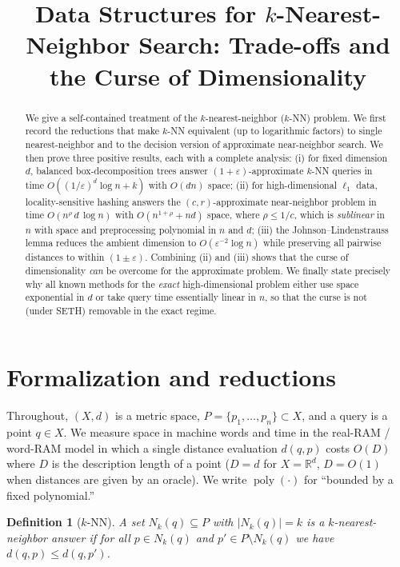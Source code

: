 \documentclass{amsart}
\newtheorem{definition}{Definition}
\DeclareMathOperator{\poly}{poly}
\newcommand{\R}{\mathbb{R}}
\newcommand{\eps}{\varepsilon}
\begin{document}
\title{Data Structures for $k$-Nearest-Neighbor Search: Trade-offs and the Curse of Dimensionality}
\maketitle

\begin{abstract}
We give a self-contained treatment of the $k$-nearest-neighbor ($k$-NN) problem.
We first record the reductions that make $k$-NN equivalent (up to logarithmic
factors) to single nearest-neighbor and to the decision version of approximate
near-neighbor search.  We then prove three positive results, each with a complete
analysis: (i) for fixed dimension $d$, balanced box-decomposition trees answer
$(1+\eps)$-approximate $k$-NN queries in time $O((1/\eps)^{d}\log n + k)$ with
$O(dn)$ space; (ii) for high-dimensional $\ell_1$ data, locality-sensitive hashing
answers the $(c,r)$-approximate near-neighbor problem in time $O(n^{\rho}\,d\,\log n)$
with $O(n^{1+\rho}+nd)$ space, where $\rho\le 1/c$, which is \emph{sublinear} in $n$
with space and preprocessing polynomial in $n$ and $d$; (iii) the
Johnson--Lindenstrauss lemma reduces the ambient dimension to $O(\eps^{-2}\log n)$
while preserving all pairwise distances to within $(1\pm\eps)$.  Combining (ii) and
(iii) shows that the curse of dimensionality \emph{can} be overcome for the
approximate problem.  We finally state precisely why all known methods for the
\emph{exact} high-dimensional problem either use space exponential in $d$ or take
query time essentially linear in $n$, so that the curse is not (under SETH) removable
in the exact regime.
\end{abstract}

\section{Formalization and reductions}

Throughout, $(X,d)$ is a metric space, $P=\{p_1,\dots,p_n\}\subset X$, and a query
is a point $q\in X$.  We measure space in machine words and time in the real-RAM /
word-RAM model in which a single distance evaluation $d(q,p)$ costs $O(D)$ where
$D$ is the description length of a point ($D=d$ for $X=\R^d$, $D=O(1)$ when distances
are given by an oracle).  We write $\poly(\cdot)$ for ``bounded by a fixed
polynomial.''

\begin{definition}[$k$-NN]
A set $N_k(q)\subseteq P$ with $|N_k(q)|=k$ is a \emph{$k$-nearest-neighbor answer}
if for all $p\in N_k(q)$ and $p'\in P\setminus N_k(q)$ we have $d(q,p)\le d(q,p')$.
\end{definition}
\end{document}
